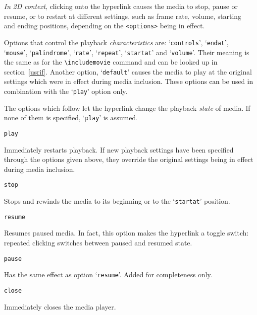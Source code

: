 \documentclass[a4paper]{article}
\begin{document}
\emph{In 2D context}, clicking onto the hyperlink causes the media to stop, pause or resume, or to restart at different settings, such as frame rate, volume, starting and ending positions, depending on the \verb+<options>+ being in effect.

Options that control the playback \emph{characteristics} are: `\verb+controls+', `\verb+endat+', `\verb+mouse+', `\verb+palindrome+', `\verb+rate+', `\verb+repeat+', `\verb+startat+' and `\verb+volume+'. Their meaning is the same as for the \verb+\includemovie+ command and can be looked up in section~\ref{usrif}. Another option, `\verb+default+' causes the media to play at the original settings which were in effect during media inclusion. These options can be used in combination with the `\verb+play+' option only.

The options which follow let the hyperlink change the playback \emph{state} of media. If none of them is specified, `\verb+play+' is assumed.
\begin{verbatim}
play
\end{verbatim}
Immediately restarts playback. If new playback settings have been specified through the options given above, they override the original settings being in effect during media inclusion.
\begin{verbatim}
stop
\end{verbatim}
Stops and rewinds the media to its beginning or to the `\verb+startat+' position.
\begin{verbatim}
resume
\end{verbatim}
Resumes paused media. In fact, this option makes the hyperlink a toggle switch: repeated clicking switches between paused and resumed state.
\begin{verbatim}
pause
\end{verbatim}
Has the same effect as option `\verb+resume+'. Added for completeness only.
\begin{verbatim}
close
\end{verbatim}
Immediately closes the media player.
\end{document}
